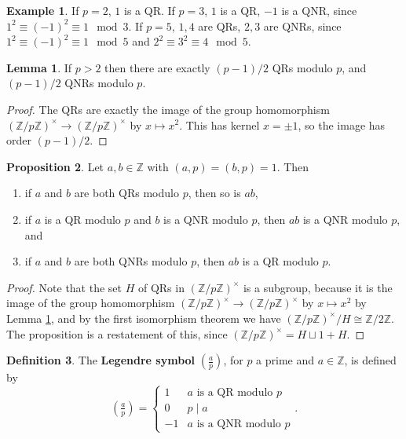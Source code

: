 \documentclass{article}
\newcommand{\Z}{\mathbb{Z}}
\newcommand{\rb}[1]{\left( #1 \right)}
\newcommand{\unit}[1]{\rb{\Z / #1\Z}^\times}
\newcommand{\legendre}[2]{\rb{\tfrac{#1}{#2}}}
\theoremstyle{definition}\newtheorem{definition}{Definition}
\theoremstyle{definition}\newtheorem{remark}[definition]{Remark}
\theoremstyle{definition}\newtheorem*{example}{Example}
\theoremstyle{definition}\newtheorem*{note}{Note}
\newtheorem{proposition}[definition]{Proposition}
\newtheorem{lemma}[definition]{Lemma}
\begin{document}
\begin{example}
If $ p = 2 $, $ 1 $ is a QR. If $ p = 3 $, $ 1 $ is a QR, $ -1 $ is a QNR, since $ 1^2 \equiv \rb{-1}^2 \equiv 1 \mod 3 $. If $ p = 5 $, $ 1, 4 $ are QRs, $ 2, 3 $ are QNRs, since $ 1^2 \equiv \rb{-1}^2 \equiv 1 \mod 5 $ and $ 2^2 \equiv 3^2 \equiv 4 \mod 5 $.
\end{example}

\begin{lemma}
\label{lem:34}
If $ p > 2 $ then there are exactly $ \rb{p - 1} / 2 $ QRs modulo $ p $, and $ \rb{p - 1} / 2 $ QNRs modulo $ p $.
\end{lemma}

\begin{proof}
The QRs are exactly the image of the group homomorphism $ \unit{p} \to \unit{p} $ by $ x \mapsto x^2 $. This has kernel $ x = \pm 1 $, so the image has order $ \rb{p - 1} / 2 $.
\end{proof}

\begin{proposition}
\label{prop:35}
Let $ a, b \in \Z $ with $ \rb{a, p} = \rb{b, p} = 1 $. Then
\begin{enumerate}
\item if $ a $ and $ b $ are both QRs modulo $ p $, then so is $ ab $,
\item if $ a $ is a QR modulo $ p $ and $ b $ is a QNR modulo $ p $, then $ ab $ is a QNR modulo $ p $, and
\item if $ a $ and $ b $ are both QNRs modulo $ p $, then $ ab $ is a QR modulo $ p $.
\end{enumerate}
\end{proposition}

\begin{proof}
Note that the set $ H $ of QRs in $ \unit{p} $ is a subgroup, because it is the image of the group homomorphism $ \unit{p} \to \unit{p} $ by $ x \mapsto x^2 $ by Lemma \ref{lem:34}, and by the first isomorphism theorem we have $ \unit{p} / H \cong \Z / 2\Z $. The proposition is a restatement of this, since $ \unit{p} = H \sqcup 1 + H $.
\end{proof}

\begin{definition}
The \textbf{Legendre symbol} $ \legendre{a}{p} $, for $ p $ a prime and $ a \in \Z $, is defined by
$$ \legendre{a}{p} = \begin{cases} 1 & a \text{ is a QR modulo } p \\ 0 & p \mid a \\ -1 & a \text{ is a QNR modulo } p \end{cases}. $$
\end{definition}
\end{document}

